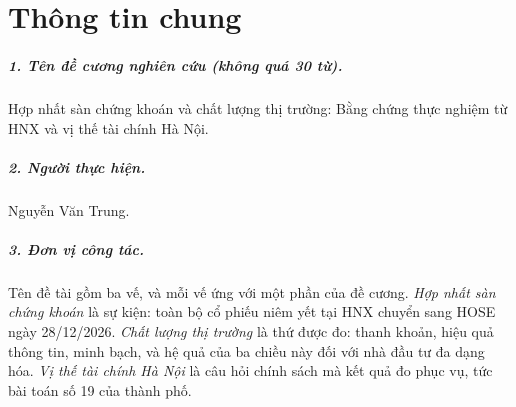 \chapter*{Thông tin chung}

\paragraph{1. Tên đề cương nghiên cứu (không quá 30 từ).} Hợp nhất sàn chứng khoán và chất lượng thị trường: Bằng chứng thực nghiệm từ HNX và vị thế tài chính Hà Nội.

\paragraph{2. Người thực hiện.} Nguyễn Văn Trung.

\paragraph{3. Đơn vị công tác.}\mbox{}\par

\bigskip
Tên đề tài gồm ba vế, và mỗi vế ứng với một phần của đề cương. \emph{Hợp nhất sàn chứng khoán} là sự kiện: toàn bộ cổ phiếu niêm yết tại HNX chuyển sang HOSE ngày 28/12/2026. \emph{Chất lượng thị trường} là thứ được đo: thanh khoản, hiệu quả thông tin, minh bạch, và hệ quả của ba chiều này đối với nhà đầu tư đa dạng hóa. \emph{Vị thế tài chính Hà Nội} là câu hỏi chính sách mà kết quả đo phục vụ, tức bài toán số 19 của thành phố.
